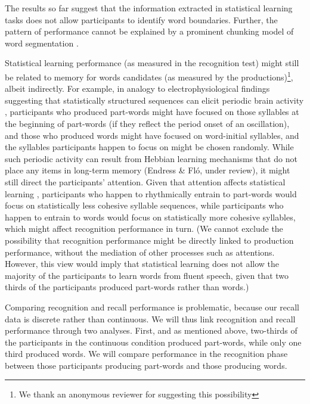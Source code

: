 \documentclass[
]{article}
\begin{document}
The results so far suggest that the information extracted in statistical
learning tasks does not allow participants to identify word boundaries.
Further, the pattern of performance cannot be explained by a prominent
chunking model of word segmentation \citep{Perruchet1998}.

Statistical learning performance (as measured in the recognition test)
might still be related to memory for words candidates (as measured by
the productions)\footnote{We thank an anonymous reviewer for suggesting
  this possibility}, albeit indirectly. For example, in analogy to
electrophysiological findings suggesting that statistically structured
sequences can elicit periodic brain activity
\citep[\citet{Flo2022},\citet{Kabdebon2015},\citet{Moser2021}]{Buiatti2009},
participants who produced part-words might have focused on those
syllables at the beginning of part-words (if they reflect the period
onset of an oscillation), and those who produced words might have
focused on word-initial syllables, and the syllables participants happen
to focus on might be chosen randomly. While such periodic activity can
result from Hebbian learning mechanisms that do not place any items in
long-term memory (Endress \& Fló, under review), it might still direct
the participants' attention. Given that attention affects statistical
learning \citep[\citet{Turk-Browne2005}]{Toro2005a}, participants who
happen to rhythmically entrain to part-words would focus on
statistically less cohesive syllable sequences, while participants who
happen to entrain to words would focus on statistically more cohesive
syllables, which might affect recognition performance in turn. (We
cannot exclude the possibility that recognition performance might be
directly linked to production performance, without the mediation of
other processes such as attentions. However, this view would imply that
statistical learning does not allow the majority of the participants to
learn words from fluent speech, given that two thirds of the
participants produced part-words rather than words.)

Comparing recognition and recall performance is problematic, because our
recall data is discrete rather than continuous. We will thus link
recognition and recall performance through two analyses. First, and as
mentioned above, two-thirds of the participants in the continuous
condition produced part-words, while only one third produced words. We
will compare performance in the recognition phase between those
participants producing part-words and those producing words.
\end{document}
